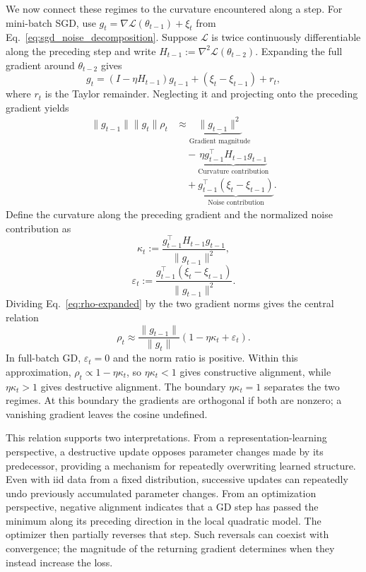 We now connect these regimes to the curvature encountered along a step.
For mini-batch SGD, use
$g_t=\nabla\mathcal L(\theta_{t-1})+\xi_t$ from
Eq.~\eqref{eq:sgd_noise_decomposition}. Suppose $\mathcal L$ is twice
continuously differentiable along the preceding step and write
$H_{t-1}:=\nabla^2\mathcal L(\theta_{t-2})$.
Expanding the full gradient around $\theta_{t-2}$ gives
\begin{equation}
  g_t=(I-\eta H_{t-1})g_{t-1}+(\xi_t-\xi_{t-1})+r_t,
  \label{eq:gradient-evolution}
\end{equation}
where $r_t$ is the Taylor remainder. Neglecting it and projecting onto
the preceding gradient yields
\begin{equation}
\begin{aligned}
\|g_{t-1}\|\|g_t\|\rho_t
 &\approx\underbrace{\|g_{t-1}\|^2}_{\text{Gradient magnitude}}\\
 &\quad-\underbrace{\eta g_{t-1}^{\top}H_{t-1}g_{t-1}}_{\text{Curvature contribution}}\\
 &\quad+\underbrace{g_{t-1}^{\top}(\xi_t-\xi_{t-1})}_{\text{Noise contribution}}.
\end{aligned}
\label{eq:rho-expanded}
\end{equation}
Define the curvature along the preceding gradient and the normalized
noise contribution as
\begin{equation}
  \kappa_t:=\frac{g_{t-1}^\top H_{t-1}g_{t-1}}{\|g_{t-1}\|^2},
  \label{eq:kappa}
\end{equation}
\begin{equation}
  \varepsilon_t:=
  \frac{g_{t-1}^\top(\xi_t-\xi_{t-1})}{\|g_{t-1}\|^2}.
  \label{eq:epsilon}
\end{equation}
Dividing Eq.~\eqref{eq:rho-expanded} by the two gradient norms gives
the central relation
\begin{equation}
  \boxed{\rho_t\approx\frac{\|g_{t-1}\|}{\|g_t\|}
                   (1-\eta\kappa_t+\varepsilon_t).}
  \label{eq:rho-normalized}
\end{equation}
In full-batch GD, $\varepsilon_t=0$ and the norm ratio is positive.
Within this approximation, $\rho_t\propto1-\eta\kappa_t$, so
$\eta\kappa_t<1$ gives constructive alignment, while $\eta\kappa_t>1$
gives destructive alignment. The boundary $\eta\kappa_t=1$ separates
the two regimes. At this boundary the gradients are orthogonal if
both are nonzero; a vanishing gradient leaves the cosine undefined.

This relation supports two interpretations. From a representation-learning
perspective, a destructive update opposes parameter changes made by its
predecessor, providing a mechanism for repeatedly overwriting learned
structure. Even with iid data from a fixed distribution, successive
updates can repeatedly undo previously accumulated parameter changes.
From an optimization perspective, negative alignment indicates
that a GD step has passed the minimum along its preceding direction in
the local quadratic model. The optimizer then partially reverses that
step. Such reversals can coexist with convergence; the magnitude of the
returning gradient determines when they instead increase the loss.

